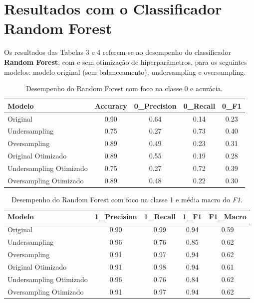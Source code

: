 \documentclass{article}
\begin{document}
\section*{Resultados com o Classificador Random Forest}


Os resultados das Tabelas 3 e 4 referem-se ao desempenho do classificador \textbf{Random Forest}, com e sem otimização de hiperparâmetros, para os seguintes modelos: modelo original (sem balanceamento), undersampling e oversampling.

\begin{table}[H]
\centering
\begin{tabular}{lcccc}
\toprule
\textbf{Modelo} & \textbf{Accuracy} & \textbf{0\_Precision} & \textbf{0\_Recall} & \textbf{0\_F1} \\
\midrule
Original                 & 0.90 & 0.64 & 0.14 & 0.23 \\
Undersampling            & 0.75 & 0.27 & 0.73 & 0.40 \\
Oversampling             & 0.89 & 0.49 & 0.23 & 0.31 \\
Original Otimizado       & 0.89 & 0.55 & 0.19 & 0.28 \\
Undersampling Otimizado  & 0.75 & 0.27 & 0.72 & 0.39 \\
Oversampling Otimizado   & 0.89 & 0.48 & 0.22 & 0.30 \\
\bottomrule
\end{tabular}
\caption{Desempenho do Random Forest com foco na classe 0 e acurácia.}
\end{table}

\vspace{0.5cm}

\begin{table}[H]
\centering
\begin{tabular}{lcccc}
\toprule
\textbf{Modelo} & \textbf{1\_Precision} & \textbf{1\_Recall} & \textbf{1\_F1} & \textbf{F1\_Macro} \\
\midrule
Original                 & 0.90 & 0.99 & 0.94 & 0.59 \\
Undersampling            & 0.96 & 0.76 & 0.85 & 0.62 \\
Oversampling             & 0.91 & 0.97 & 0.94 & 0.62 \\
Original Otimizado       & 0.91 & 0.98 & 0.94 & 0.61 \\
Undersampling Otimizado  & 0.96 & 0.76 & 0.84 & 0.62 \\
Oversampling Otimizado   & 0.91 & 0.97 & 0.94 & 0.62 \\
\bottomrule
\end{tabular}
\caption{Desempenho do Random Forest com foco na classe 1 e média macro do \textit{F1}.}
\end{table}
\end{document}
